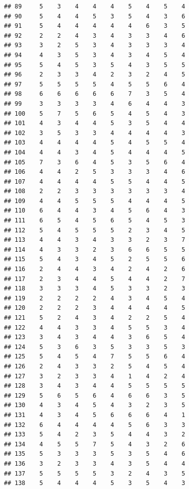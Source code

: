 \documentclass[
]{article}
\begin{document}
\begin{verbatim}
## 89     5    3    4    4    4    5    4    5    4
## 90     5    4    4    5    3    5    4    3    6
## 91     5    4    4    4    4    4    6    3    5
## 92     2    2    4    3    4    3    3    4    6
## 93     3    2    5    3    4    3    3    3    4
## 94     4    3    5    3    4    3    4    5    4
## 95     5    4    5    3    5    4    3    5    5
## 96     2    3    3    4    2    3    2    4    5
## 97     5    5    5    5    4    5    5    6    4
## 98     6    6    6    6    6    7    3    5    4
## 99     3    3    3    3    4    6    4    4    3
## 100    5    7    5    6    5    4    5    4    3
## 101    4    3    4    4    5    3    5    4    4
## 102    3    5    3    3    4    4    4    4    3
## 103    4    4    4    4    5    4    5    5    4
## 104    4    4    3    4    5    4    4    4    5
## 105    7    3    6    4    5    3    5    6    4
## 106    4    4    2    5    3    3    3    4    6
## 107    4    4    4    4    5    5    4    4    5
## 108    2    2    3    3    3    3    3    3    4
## 109    4    4    5    5    5    4    4    4    5
## 110    6    4    4    3    4    5    6    4    3
## 111    6    5    4    5    6    5    4    5    3
## 112    5    4    5    5    5    2    3    4    5
## 113    4    4    3    4    3    3    2    3    7
## 114    4    3    3    2    3    6    6    5    5
## 115    5    4    3    4    5    2    5    5    6
## 116    2    4    4    3    4    2    4    2    6
## 117    2    3    4    4    5    4    4    2    7
## 118    3    3    3    4    5    3    3    2    3
## 119    2    2    2    2    4    3    4    5    4
## 120    2    2    2    3    4    4    4    4    5
## 121    5    2    4    3    4    2    2    5    4
## 122    4    4    3    3    4    5    5    3    4
## 123    3    4    3    4    4    3    6    5    4
## 124    5    3    6    3    5    3    3    5    3
## 125    5    4    5    4    7    5    5    6    4
## 126    2    4    3    3    2    5    4    5    4
## 127    3    2    3    3    4    1    4    2    4
## 128    3    4    3    4    4    5    5    5    5
## 129    5    6    5    6    4    6    6    3    5
## 130    4    3    4    5    4    3    2    3    5
## 131    4    3    4    5    6    6    6    4    1
## 132    6    4    4    4    4    5    6    3    3
## 133    5    4    2    3    5    4    4    3    2
## 134    4    5    5    7    5    4    3    2    6
## 135    5    3    3    3    5    3    5    4    6
## 136    3    2    3    3    4    3    5    4    4
## 137    5    5    5    5    3    2    4    3    5
## 138    5    4    4    4    5    3    5    4    3

\end{verbatim}
\end{document}
